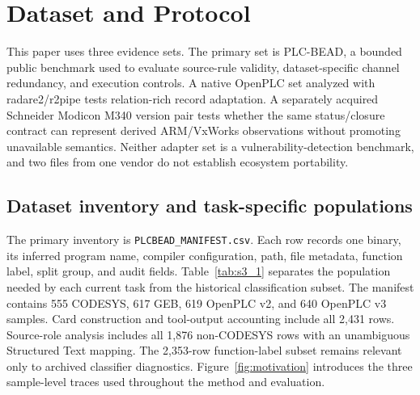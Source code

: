 \documentclass[a4paper,fleqn]{cas-dc}
\begin{document}

\section{Dataset and Protocol}

This paper uses three evidence sets. The primary set is PLC-BEAD, a bounded public benchmark used to evaluate source-rule validity, dataset-specific channel redundancy, and execution controls. A native OpenPLC set analyzed with radare2/r2pipe tests relation-rich record adaptation. A separately acquired Schneider Modicon M340 version pair tests whether the same status/closure contract can represent derived ARM/VxWorks observations without promoting unavailable semantics. Neither adapter set is a vulnerability-detection benchmark, and two files from one vendor do not establish ecosystem portability.

\subsection{Dataset inventory and task-specific populations}

The primary inventory is \texttt{PLCBEAD\_MANIFEST.csv}. Each row records one binary, its inferred program name, compiler configuration, path, file metadata, function label, split group, and audit fields. Table~\ref{tab:s3_1} separates the population needed by each current task from the historical classification subset. The manifest contains 555 CODESYS, 617 GEB, 619 OpenPLC v2, and 640 OpenPLC v3 samples. Card construction and tool-output accounting include all 2{,}431 rows. Source-role analysis includes all 1{,}876 non-CODESYS rows with an unambiguous Structured Text mapping. The 2{,}353-row function-label subset remains relevant only to archived classifier diagnostics. Figure~\ref{fig:motivation} introduces the three sample-level traces used throughout the method and evaluation.
\end{document}
